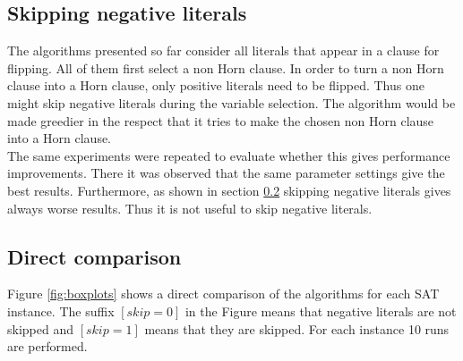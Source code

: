 \documentclass[12pt,a4paper]{article}
\begin{document}
\subsection{Skipping negative literals}
\label{sec:skip}
The algorithms presented so far consider all literals that appear in a clause for flipping. All of them first select a non Horn clause. In order to turn a non Horn clause into a Horn clause, only positive literals need to be flipped. Thus one might skip negative literals during the variable selection.  The algorithm would be made greedier in the respect that it tries to make the chosen non Horn clause into a Horn clause.\\

The same experiments were repeated to evaluate whether this gives performance improvements. There it was observed that the same parameter settings give the best results. Furthermore, as shown in section \ref{sec:dir_comp} skipping negative literals gives always worse results. Thus it is not useful to skip negative literals.
\subsection{Direct comparison}
\label{sec:dir_comp}
Figure \ref{fig:boxplots} shows a direct comparison of the algorithms for each SAT instance. The suffix $[skip=0]$ in the Figure means that negative literals are not skipped and $[skip=1]$ means that they are skipped. For each instance 10 runs are performed.\\
\end{document}
